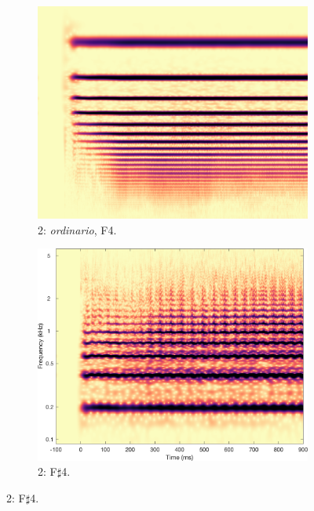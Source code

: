 \begin{figure}
        \begin{subfigure}{0.20\textwidth}
                \centering
                \includegraphics[width=\linewidth]{./figs/demo/TpC-ord-F4-mf.png}
                \caption*{2: \emph{ordinario}, F4.}
                \label{fig:TpC-ord-F4-mf}
        \end{subfigure}%
        \begin{subfigure}{0.20\textwidth}
                \centering
                \includegraphics[width=\linewidth]{./figs/demo/TpC-flatt-Fsh4-mf.png}
                \caption*{2: F$\sharp$4.}
                \label{fig:TpC-flatt-Fsh4-mf-right}
        \end{subfigure}%


\end{figure}
